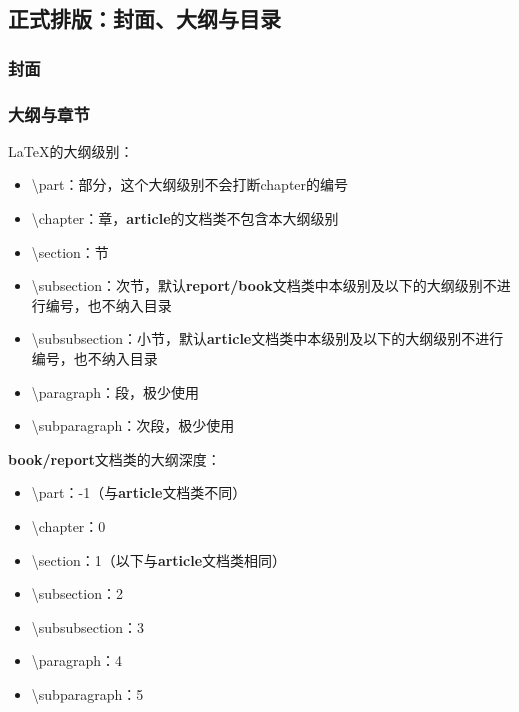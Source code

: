 \documentclass{ctexart}
\begin{document}
    \subsection{正式排版：封面、大纲与目录}
        \subsubsection{封面}
        \subsubsection{大纲与章节}
            \LaTeX 的大纲级别：

            \begin{itemize}
                \item \textbackslash part：部分，这个大纲级别不会打断chapter的编号
                \item \textbackslash chapter：章，\textbf{article}的文档类不包含本大纲级别
                \item \textbackslash section：节
                \item \textbackslash subsection：次节，默认\textbf{report/book}文档类中本级别及以下的大纲级别不进行编号，也不纳入目录
                \item \textbackslash subsubsection：小节，默认\textbf{article}文档类中本级别及以下的大纲级别不进行编号，也不纳入目录
                \item \textbackslash paragraph：段，极少使用
                \item \textbackslash subparagraph：次段，极少使用
            \end{itemize}

            \textbf{book/report}文档类的大纲深度：

            \begin{itemize}
                \item \textbackslash part：-1（与\textbf{article}文档类不同）
                \item \textbackslash chapter：0
                \item \textbackslash section：1（以下与\textbf{article}文档类相同）
                \item \textbackslash subsection：2
                \item \textbackslash subsubsection：3
                \item \textbackslash paragraph：4
                \item \textbackslash subparagraph：5
            \end{itemize}
\end{document}
